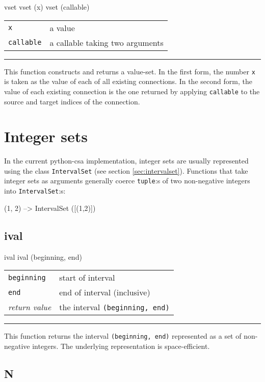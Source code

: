 \documentclass[a4paper,twoside]{report}
\makeatletter
\newenvironment{parameters}%
{\begin{tabular}{@{\hspace{2em}}lp{0.6\textwidth}}}%
{\end{tabular}\par\vspace{1mm}\par\hrule\par\vspace{5mm}}
\newcommand{\cls}[1]{\lstinline|#1|}
\newcommand{\fa}[1]{\lstinline|#1|}
\makeatother
\begin{document}
\begin{head}{vset}
  vset (x)
  vset (callable)
\end{head}
\begin{parameters}
  \lstinline|x| &%
  a value\\
  \lstinline|callable| &%
  a callable taking two arguments\\
\end{parameters}
This function constructs and returns a value-set.  In the first form,
the number \fa{x} is taken as the value of each of all existing
connections.  In the second form, the value of each existing
connection is the one returned by applying \fa{callable} to the source
and target indices of the connection.

\section{Integer sets}
In the current python-csa implementation, integer sets are usually
represented using the class \cls{IntervalSet} (see section
\ref{sec:intervalset}).  Functions that take integer sets as arguments
generally coerce \cls{tuple}:s of two non-negative integers into
\cls{IntervalSet}:s:
\begin{code}{}
  (1, 2) --> IntervalSet ([(1,2)])
\end{code}

\subsection{ival}

\begin{head}{ival}
  ival (beginning, end)
\end{head}
\begin{parameters}
  \lstinline|beginning| &%
  start of interval\\
  \lstinline|end| &%
  end of interval (inclusive)\\
  \emph{return value} &%
  the interval \lstinline|(beginning, end)|\\
\end{parameters}
This function returns the interval \lstinline|(beginning, end)|
represented as a set of non-negative integers.  The underlying
representation is space-efficient.

\subsection{N}
\end{document}
